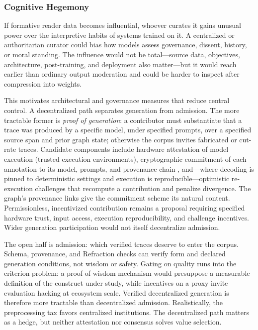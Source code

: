 \subsubsection{Cognitive Hegemony}

If formative reader data becomes influential, whoever curates it gains unusual
power over the interpretive habits of systems trained on it. A centralized or
authoritarian curator could bias how models assess governance, dissent, history,
or moral standing. The influence would not be total---source data, objectives,
architecture, post-training, and deployment also matter---but it would reach
earlier than ordinary output moderation and could be harder to inspect after
compression into weights.

This motivates architectural and governance measures that reduce central control. A decentralized path separates generation from admission. The more tractable former is \emph{proof of generation}: a contributor must substantiate that a trace was produced by a specific model, under specified prompts, over a specified source span and prior graph state; otherwise the corpus invites fabricated or cut-rate traces. Candidate components include hardware attestation of model execution (trusted execution environments), cryptographic commitment of each annotation to its model, prompts, and provenance chain \cite{arutyunyan2023decentralized, harris2019decentralized}, and---where decoding is pinned to deterministic settings and execution is reproducible---optimistic re-execution challenges that recompute a contribution and penalize divergence. The graph's provenance links give the commitment scheme its natural content. Permissionless, incentivized contribution remains a proposal requiring specified hardware trust, input access, execution reproducibility, and challenge incentives. Wider generation participation would not itself decentralize admission.

The open half is admission: which verified traces deserve to enter the corpus.
Schema, provenance, and Refraction checks can verify form and declared
generation conditions, not wisdom or safety. Gating on quality runs into the
criterion problem: a proof-of-wisdom mechanism would presuppose a measurable
definition of the construct under study, while incentives on a proxy invite
evaluation hacking at ecosystem scale. Verified decentralized generation is
therefore more tractable than decentralized admission. Realistically, the
preprocessing tax favors centralized institutions. The decentralized path
matters as a hedge, but neither attestation nor consensus solves value selection.


